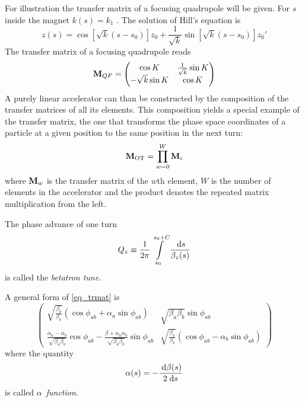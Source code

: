 For illustration the transfer matrix of a focusing quadrupole will be given.
For $s$ inside the magnet $k(s) = k_1$ . The solution of Hill's equation is
%
\begin{equation}
    z(s) = \cos \left[ \sqrt{k}(s-s_0)\right] z_0 + \frac{1}{\sqrt{k}}\sin\left[\sqrt{k}(s-s_0)\right]z_0'
\end{equation}
%
The transfer matrix of a focusing quadrupole reads
%
\begin{equation}
    \mathbf{M}_{QF} =
    \begin{pmatrix}
        \cos K & \frac{1}{\sqrt{k}} \sin K \\
        -\sqrt{k}\sin K & \cos K
    \end{pmatrix}
\end{equation}
%
A purely linear accelerator can than be constructed by the composition of the transfer matrices of 
all its elements. This composition yields a special example of the transfer matrix, the one that
transforms the phase space coordinates of a particle at a given position to the same position in the
next turn:
%
\begin{equation}
    \mathbf{M}_\text{OT} = \prod\limits_{w=0}^W \mathbf{M}_i
\end{equation}
%
where $\mathbf{M}_w$ is the transfer matrix of the $w$th element, $W$ is the number of elements in the
accelerator and the product denotes the repeated matrix multiplication from the left.

The phase advance of one turn
%
\begin{equation}
    Q_z \equiv \frac{1}{2\pi}\int\limits_{s_0}^{s_0+C} \frac{\;\text{d} s}{\beta_z(s)}
\end{equation}
%
is called the \emph{betatron tune}.

A general form of \eqref{eq_trmat} is 
%
\begin{equation}
    \begin{pmatrix}
        \sqrt{\frac{\beta_b}{\beta_a}}(\cos\phi_{ab} + \alpha_a \sin\phi_{ab}) &
        \sqrt{\beta_a\beta_b} \sin\phi_{ab} \\
        \frac{\alpha_a - \alpha_b}{\sqrt{\beta_a\beta_b}}\cos\phi_{ab} - \frac{\beta+\alpha_a\alpha_b}{\sqrt{\beta_a\beta_b}}\sin\phi_{ab} &
        \sqrt{\frac{\beta_a}{\beta_b}}(\cos\phi_{ab} - \alpha_b\sin\phi_{ab})
    \end{pmatrix}
    \label{eq_trmat_01}
\end{equation}
%
where the quantity
%
\begin{equation}
    \alpha(s) = -\frac{\;\text{d} \beta(s)}{2 \;\text{d} s}
    \label{eq_alpha}
\end{equation}
%
is called $\alpha$~\emph{function}.


